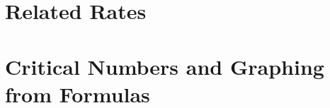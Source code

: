 \documentclass[12pt,]{book}
\theoremstyle{plain}
\theoremstyle{definition}
\numberwithin{equation}{section}
\begin{document}
\chapter[Related Rates]{Related Rates}\label{chapter-related-rates}
\typeout{************************************************}
\typeout{************************************************}
\chapter[Critical Numbers and Graphing from Formulas]{Critical Numbers and Graphing from Formulas}\label{chapter-critical-numbers-graphing-from-formulas}
%
\backmatter
%
\end{document}
